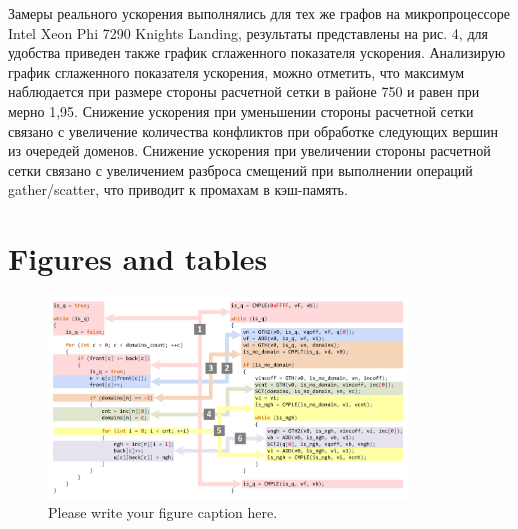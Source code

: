 \documentclass[
11pt,%
tightenlines,%
twoside,%
onecolumn,%
nofloats,%
nobibnotes,%
nofootinbib,%
superscriptaddress,%
noshowpacs,%
centertags]%
{revtex4}
\begin{document}
Замеры реального ускорения выполнялись для тех же графов на микропроцессоре Intel Xeon Phi 7290 Knights Landing, результаты представлены на рис. 4, для удобства приведен также график сглаженного показателя ускорения.
Анализирую график сглаженного показателя ускорения, можно отметить, что максимум наблюдается при размере стороны расчетной сетки в районе 750 и равен при мерно 1,95.
Снижение ускорения при уменьшении стороны расчетной сетки связано с увеличение количества конфликтов при обработке следующих вершин из очередей доменов.
Снижение ускорения при увеличении стороны расчетной сетки связано с увеличением разброса смещений при выполнении операций gather/scatter, что приводит к промахам в кэш-память.

\section{Figures and tables}

\begin{figure}[h]
\setcaptionmargin{5mm}
\onelinecaptionstrue  %
\includegraphics[width=0.85\textwidth]{pics/code.pdf}
\caption{Please write your figure caption here.}\label{fig:code}
\end{figure}
\end{document}
